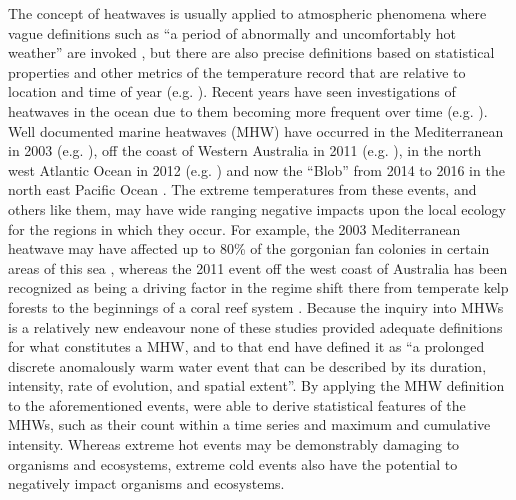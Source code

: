 \documentclass[a4paper,10pt,review]{elsarticle}
\begin{document}
The concept of heatwaves is usually applied to atmospheric phenomena where vague definitions such as ``a period of abnormally and uncomfortably hot weather'' are invoked \citep{Glickman2000}, but there are also precise definitions based on statistical properties and other metrics of the temperature record that are relative to location and time of year (e.g. \cite{Meehl2004, Alexander2006, Fischer2010, Fischer2011, Perkins2013}). Recent years have seen investigations of heatwaves in the ocean due to them becoming more frequent over time (e.g. \cite{Mackenzie2007, Selig2010, Sura2011, Lima2012, DeCastro2014}). Well documented marine heatwaves (MHW) have occurred in the Mediterranean in 2003 (e.g. \cite{Black2004, Olita2007, Garrabou2009}), off the coast of Western Australia in 2011 (e.g. \cite{Feng2013, Pearce2013, Wernberg2013}), in the north west Atlantic Ocean in 2012 (e.g. \cite{Mills2012, Chen2014, Chen2015}) and now the ``Blob'' from 2014 to 2016 in the north east Pacific Ocean \citep{Bond2015}. The extreme temperatures from these events, and others like them, may have wide ranging negative impacts upon the local ecology for the regions in which they occur. For example, the 2003 Mediterranean heatwave may have affected up to 80\% of the gorgonian fan colonies in certain areas of this sea \citep{Garrabou2009}, whereas the 2011 event off the west coast of Australia has been recognized as being a driving factor in the regime shift there from temperate kelp forests to the beginnings of a coral reef system \citep{Wernberg2013}. Because the inquiry into MHWs is a relatively new endeavour none of these studies provided adequate definitions for what constitutes a MHW, and to that end \citet{Hobday2016} have defined it as ``a prolonged discrete anomalously warm water event that can be described by its duration, intensity, rate of evolution, and spatial extent''. By applying the MHW definition to the aforementioned events, \citet{Hobday2016} were able to derive statistical features of the MHWs, such as their count within a time series and maximum and cumulative intensity. Whereas extreme hot events may be demonstrably damaging to organisms and ecosystems, extreme cold events also have the potential to negatively impact organisms and ecosystems.
\end{document}
